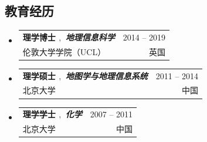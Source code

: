 \documentclass[A4,11pt]{article}
\makeatletter
\newcommand{\CVSubheading}[4]{
  \vspace{-2pt}\item
    \begin{tabular*}{0.97\textwidth}[t]{l@{\extracolsep{\fill}}r}
      \textbf{#1} & #2 \\
      \small#3 & \small #4 \\
    \end{tabular*}\vspace{-7pt}
}
\newcommand{\CVSubHeadingListStart}{\begin{itemize}[leftmargin=0.5cm, label={}]}
\newcommand{\CVSubHeadingListEnd}{\end{itemize}}
\makeatother
\begin{document}
\begin{CJK*}{UTF8}{gbsn}

\section{教育经历}
  \CVSubHeadingListStart
    \CVSubheading
      {{\textbf{理学博士}  $,$ \emph{\small{地理信息科学}}}}{2014 -- 2019}
      {伦敦大学学院（UCL）}{英国}
    \CVSubheading
      {{理学硕士  $,$ \emph{\small{地图学与地理信息系统}}}}{2011 -- 2014}
      {北京大学}{中国}
    \CVSubheading
      {{理学学士  $,$ \emph{\small{化学}}}}{2007 -- 2011}
      {北京大学}{中国}
  \CVSubHeadingListEnd


\end{CJK*}
\end{document}

